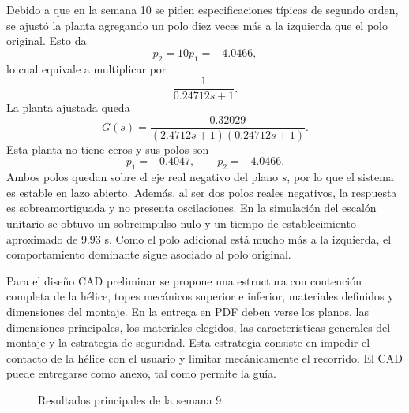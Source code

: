 \documentclass[conference]{IEEEtran}
\begin{document}
Debido a que en la semana 10 se piden especificaciones t\'ipicas de segundo orden, se ajust\'o la planta agregando un polo diez veces m\'as a la izquierda que el polo original. Esto da
\begin{equation}
p_2=10p_1=-4.0466,
\end{equation}
lo cual equivale a multiplicar por
\begin{equation}
\frac{1}{0.24712s+1}.
\end{equation}
La planta ajustada queda
\begin{equation}
G(s)=\frac{0.32029}{(2.4712s+1)(0.24712s+1)}.
\label{eq:g}
\end{equation}
Esta planta no tiene ceros y sus polos son
\begin{equation}
p_1=-0.4047, \qquad p_2=-4.0466.
\end{equation}
Ambos polos quedan sobre el eje real negativo del plano $s$, por lo que el sistema es estable en lazo abierto. Adem\'as, al ser dos polos reales negativos, la respuesta es sobreamortiguada y no presenta oscilaciones. En la simulaci\'on del escal\'on unitario se obtuvo un sobreimpulso nulo y un tiempo de establecimiento aproximado de $9.93$ s. Como el polo adicional est\'a mucho m\'as a la izquierda, el comportamiento dominante sigue asociado al polo original.

Para el dise\~no CAD preliminar se propone una estructura con contenci\'on completa de la h\'elice, topes mec\'anicos superior e inferior, materiales definidos y dimensiones del montaje. En la entrega en PDF deben verse los planos, las dimensiones principales, los materiales elegidos, las caracter\'isticas generales del montaje y la estrategia de seguridad. Esta estrategia consiste en impedir el contacto de la h\'elice con el usuario y limitar mec\'anicamente el recorrido. El CAD puede entregarse como anexo, tal como permite la gu\'ia.

\begin{figure}[!t]
\centering
\begin{minipage}{0.48\columnwidth}
\centering
{}
\end{minipage}\hfill
\begin{minipage}{0.48\columnwidth}
\centering
{}
\end{minipage}
\caption{Resultados principales de la semana 9.}
\label{fig:sem9}
\end{figure}
\end{document}
